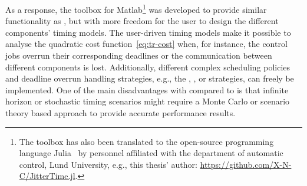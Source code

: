 As a response, the  toolbox for Matlab\footnote{The  toolbox has also been translated to the open-source programming language Julia~\cite{Julia:2017} by personnel affiliated with the department of automatic control, Lund University, e.g., this thesis' author: \url{https://github.com/X-N-C/JitterTime.jl}.} was developed to provide similar functionality as , but with more freedom for the user to design the different components' timing models.
The user-driven timing models make it possible to analyse the quadratic cost function~\eqref{eq:tr-cost} when, for instance, the control jobs overrun their corresponding deadlines or the communication between different components is lost.
Additionally, different complex scheduling policies and deadline overrun handling strategies, e.g., the \tK{}, \tS{}, or \tQ{} strategies, can freely be implemented.
One of the main disadvantages with  compared to  is that infinite horizon or stochastic timing scenarios might require a Monte Carlo or scenario theory based approach to provide accurate performance results.


